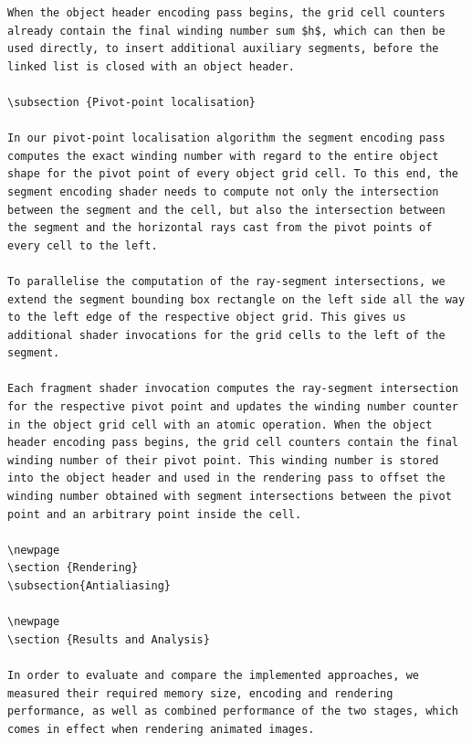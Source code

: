 \documentclass[11pt,a4paper,twoside]{article}
\begin{document}
\begin {verbatim}
When the object header encoding pass begins, the grid cell counters already contain the final winding number sum $h$, which can then be used directly, to insert additional auxiliary segments, before the linked list is closed with an object header.

\subsection {Pivot-point localisation}

In our pivot-point localisation algorithm the segment encoding pass computes the exact winding number with regard to the entire object shape for the pivot point of every object grid cell. To this end, the segment encoding shader needs to compute not only the intersection between the segment and the cell, but also the intersection between the segment and the horizontal rays cast from the pivot points of every cell to the left.

To parallelise the computation of the ray-segment intersections, we extend the segment bounding box rectangle on the left side all the way to the left edge of the respective object grid. This gives us additional shader invocations for the grid cells to the left of the segment.

Each fragment shader invocation computes the ray-segment intersection for the respective pivot point and updates the winding number counter in the object grid cell with an atomic operation. When the object header encoding pass begins, the grid cell counters contain the final winding number of their pivot point. This winding number is stored into the object header and used in the rendering pass to offset the winding number obtained with segment intersections between the pivot point and an arbitrary point inside the cell.

\newpage
\section {Rendering}
\subsection{Antialiasing}

\newpage
\section {Results and Analysis}

In order to evaluate and compare the implemented approaches, we measured their required memory size, encoding and rendering performance, as well as combined performance of the two stages, which comes in effect when rendering animated images.


\end{verbatim}
\end{document}
